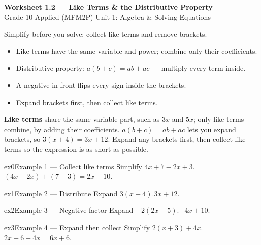 \documentclass[11pt]{article}
\begin{document}
\begin{center}
{\LARGE\bfseries\color{titleblue}Worksheet 1.2 --- Like Terms \& the Distributive Property}\\[2pt]
{\small Grade 10 Applied (MFM2P) \textperiodcentered{} Unit 1: Algebra \& Solving Equations}
\end{center}

\begin{ideabox}
Simplify before you solve: collect like terms and remove brackets.
\begin{itemize}[leftmargin=*,itemsep=2pt]
  \item Like terms have the same variable and power; combine only their coefficients.
  \item Distributive property: $a(b+c)=ab+ac$ — multiply every term inside.
  \item A negative in front flips every sign inside the brackets.
  \item Expand brackets first, then collect like terms.
\end{itemize}
\end{ideabox}

\begin{learnbox}
\textbf{Like terms} share the same variable part, such as $3x$ and $5x$; only like terms combine, by adding their coefficients.
$a(b+c)=ab+ac$ lets you expand brackets, so $3(x+4)=3x+12$.
Expand any brackets first, then collect like terms so the expression is as short as possible.
\end{learnbox}


\begin{example}{ex0}{Example 1 --- Collect like terms}
Simplify $4x+7-2x+3$.\soln $(4x-2x)+(7+3)=2x+10$.
\end{example}

\begin{example}{ex1}{Example 2 --- Distribute}
Expand $3(x+4)$.\soln $3x+12$.
\end{example}

\begin{example}{ex2}{Example 3 --- Negative factor}
Expand $-2(2x-5)$.\soln $-4x+10$.
\end{example}

\begin{example}{ex3}{Example 4 --- Expand then collect}
Simplify $2(x+3)+4x$.\soln $2x+6+4x=6x+6$.
\end{example}
\end{document}
